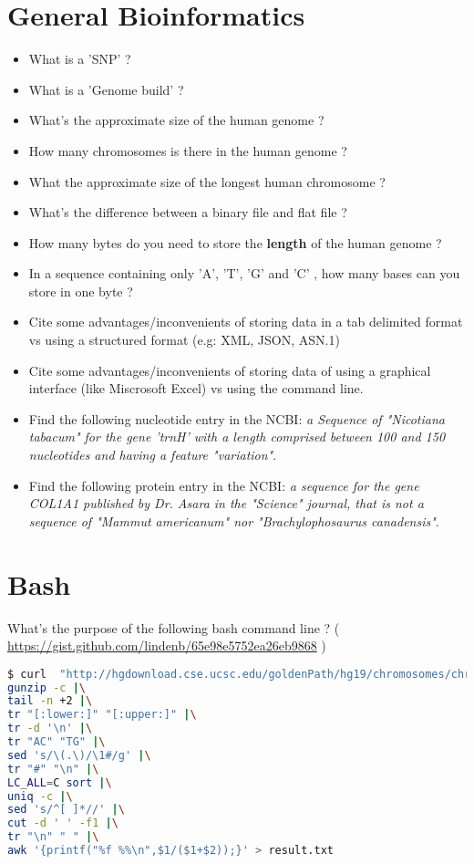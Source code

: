 \documentclass{article}
\begin{document}
%

\section{General Bioinformatics}
\begin{itemize}
\item What is a 'SNP' ? 
\item What is a 'Genome build' ?
\item What's the approximate size of the human genome ?
\item How many chromosomes is there in the human genome ?
\item What the approximate size of the longest human chromosome ?
\item What's the difference between a binary file and flat file ?
\item How many bytes do you need to store the \textbf{length} of the human genome ?
\item In a sequence containing only 'A', 'T', 'G' and 'C' , how many bases can you store in one byte ?
\item Cite some advantages/inconvenients of storing data in a tab delimited format vs using a structured format (e.g: XML, JSON, ASN.1)
\item Cite some advantages/inconvenients of storing data of using a graphical interface (like Miscrosoft Excel) vs using the command line.
\item Find the following nucleotide entry in the NCBI:\emph{ a Sequence of "Nicotiana tabacum" for the gene 'trnH' with a length comprised between 100 and 150 nucleotides and having a feature "variation"}.
\item Find the following protein entry in the NCBI:\emph{ a sequence for the gene COL1A1 published by Dr. Asara in the "Science" journal,  that is not a sequence of "Mammut americanum" nor "Brachylophosaurus canadensis"}.
\end{itemize}

\section{Bash}
\noindent
What's the purpose of the following bash command line ? ( \url{https://gist.github.com/lindenb/65e98e5752ea26eb9868} )

\begin{lstlisting}[language=bash]
$ curl  "http://hgdownload.cse.ucsc.edu/goldenPath/hg19/chromosomes/chrM.fa.gz" |\
gunzip -c |\
tail -n +2 |\
tr "[:lower:]" "[:upper:]" |\
tr -d '\n' |\
tr "AC" "TG" |\
sed 's/\(.\)/\1#/g' |\
tr "#" "\n" |\
LC_ALL=C sort |\
uniq -c |\
sed 's/^[ ]*//' |\
cut -d ' ' -f1 |\
tr "\n" " " |\
awk '{printf("%f %%\n",$1/($1+$2));}' > result.txt
\end{lstlisting}
\end{document}
